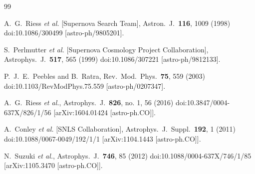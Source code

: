 \documentclass[floatfix,aps,amsmath,nofootinbib,onecolumn,10pt]{revtex4}
\begin{document}
\begin{thebibliography}{99}
\frenchspacing

  A.~G.~Riess {\it et al.} [Supernova Search Team],
  Astron.\ J.\  {\bf 116}, 1009 (1998)
  doi:10.1086/300499
  [astro-ph/9805201].
 

  S.~Perlmutter {\it et al.} [Supernova Cosmology Project Collaboration],
  Astrophys.\ J.\  {\bf 517}, 565 (1999)
  doi:10.1086/307221
  [astro-ph/9812133].

  P.~J.~E.~Peebles and B.~Ratra,
  Rev.\ Mod.\ Phys.\  {\bf 75}, 559 (2003)
  doi:10.1103/RevModPhys.75.559
  [astro-ph/0207347].
  
  A.~G.~Riess {\it et al.},
  Astrophys.\ J.\  {\bf 826}, no. 1, 56 (2016)
  doi:10.3847/0004-637X/826/1/56
  [arXiv:1604.01424 [astro-ph.CO]].
 
  A.~Conley {\it et al.} [SNLS Collaboration],
  Astrophys.\ J.\ Suppl.\  {\bf 192}, 1 (2011)
  doi:10.1088/0067-0049/192/1/1
  [arXiv:1104.1443 [astro-ph.CO]].
  
  N.~Suzuki {\it et al.},
  Astrophys.\ J.\  {\bf 746}, 85 (2012)
  doi:10.1088/0004-637X/746/1/85
  [arXiv:1105.3470 [astro-ph.CO]].


\end{thebibliography}
\end{document}
